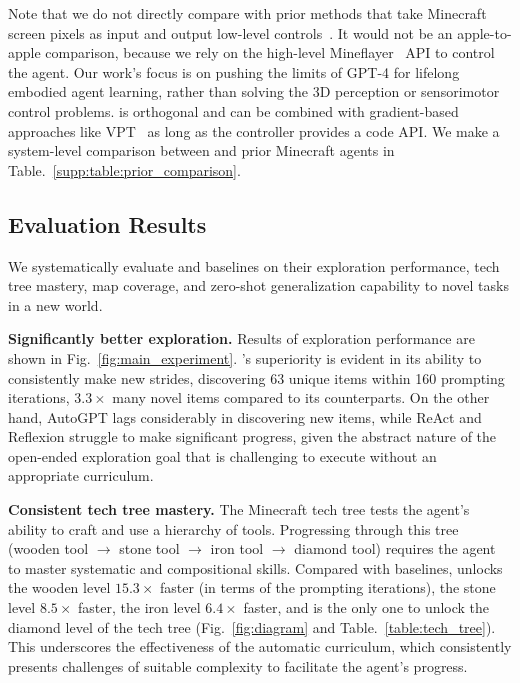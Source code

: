 
Note that we do not directly compare with prior methods that take Minecraft screen pixels as input and output low-level controls~\cite{nottingham2023embodied,cai2023openworld,wang2023describe}. It would not be an apple-to-apple comparison, because we rely on the high-level Mineflayer~\cite{mineflayer} API to control the agent. Our work's focus is on pushing the limits of GPT-4 for lifelong embodied agent learning, rather than solving the 3D perception or sensorimotor control problems. \voyager is orthogonal and can be combined with gradient-based approaches like VPT~\cite{openai2022vpt} as long as the controller provides a code API. We make a system-level comparison between \voyager and prior Minecraft agents in Table.~\ref{supp:table:prior_comparison}.

\subsection{Evaluation Results}
We systematically evaluate \voyager and baselines on their exploration performance, tech tree mastery, map coverage, and zero-shot generalization capability to novel tasks in a new world. 

\textbf{Significantly better exploration.} Results of exploration performance are shown in Fig.~\ref{fig:main_experiment}. \voyager's superiority is evident in its ability to consistently make new strides, discovering 63 unique items within 160 prompting iterations, $3.3 \times$ many novel items compared to its counterparts. On the other hand, AutoGPT lags considerably in discovering new items, while ReAct and Reflexion struggle to make significant progress, given the abstract nature of the open-ended exploration goal that is challenging to execute without an appropriate curriculum.

\textbf{Consistent tech tree mastery.} 
The Minecraft tech tree tests the agent's ability to craft and use a hierarchy of tools. 
Progressing through this tree (wooden tool $\rightarrow$ stone tool $\rightarrow$ iron tool $\rightarrow$ diamond tool) requires the agent to master systematic and compositional skills. 
Compared with baselines, \voyager unlocks the wooden level $15.3 \times$ faster (in terms of the prompting iterations), the stone level $8.5 \times$ faster, the iron level $6.4 \times$ faster, and \voyager is the only one to unlock the diamond level of the tech tree  (Fig.~\ref{fig:diagram} and Table.~\ref{table:tech_tree}). This underscores the effectiveness of the automatic curriculum, which consistently presents challenges of suitable complexity to facilitate the agent's progress.

